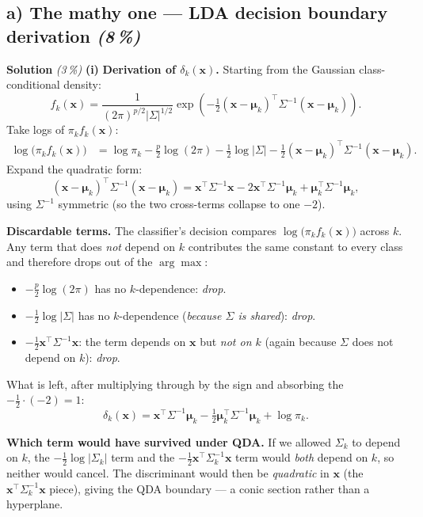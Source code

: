 \documentclass[11pt,a4paper]{article}
\newcommand{\subpoints}[1]{\textit{(#1\,\%)}}
\newcommand{\sol}{\noindent\textbf{Solution}}
\begin{document}
\subsection*{a) The mathy one --- LDA decision boundary derivation \subpoints{8}}

\sol{} \subpoints{3} \textbf{(i)} \textbf{Derivation of $\delta_k(\mathbf x)$.} Starting from the
Gaussian class-conditional density:
$$f_k(\mathbf x) = \frac{1}{(2\pi)^{p/2}|\Sigma|^{1/2}}
   \exp\!\left(-\tfrac{1}{2}(\mathbf x - \boldsymbol\mu_k)^\top\Sigma^{-1}(\mathbf x - \boldsymbol\mu_k)\right).$$
Take logs of $\pi_k f_k(\mathbf x)$:
\begin{align*}
\log\!\bigl(\pi_k f_k(\mathbf x)\bigr)
   &= \log\pi_k - \tfrac{p}{2}\log(2\pi) - \tfrac{1}{2}\log|\Sigma|
      - \tfrac{1}{2}(\mathbf x - \boldsymbol\mu_k)^\top\Sigma^{-1}(\mathbf x - \boldsymbol\mu_k).
\end{align*}
Expand the quadratic form:
$$(\mathbf x - \boldsymbol\mu_k)^\top\Sigma^{-1}(\mathbf x - \boldsymbol\mu_k)
   = \mathbf x^\top\Sigma^{-1}\mathbf x
     - 2\mathbf x^\top\Sigma^{-1}\boldsymbol\mu_k
     + \boldsymbol\mu_k^\top\Sigma^{-1}\boldsymbol\mu_k,$$
using $\Sigma^{-1}$ symmetric (so the two cross-terms collapse to one $-2$).

\medskip
\textbf{Discardable terms.} The classifier's decision compares
$\log\!\bigl(\pi_k f_k(\mathbf x)\bigr)$ across $k$. Any term that does \emph{not} depend on $k$
contributes the same constant to every class and therefore drops out of the $\arg\max$:
\begin{itemize}
  \item $-\tfrac{p}{2}\log(2\pi)$ has no $k$-dependence: \emph{drop}.
  \item $-\tfrac{1}{2}\log|\Sigma|$ has no $k$-dependence (\emph{because $\Sigma$ is shared}): \emph{drop}.
  \item $-\tfrac{1}{2}\mathbf x^\top\Sigma^{-1}\mathbf x$: the term depends on $\mathbf x$ but
        \emph{not on $k$} (again because $\Sigma$ does not depend on $k$): \emph{drop}.
\end{itemize}
What is left, after multiplying through by the sign and absorbing the $-\tfrac{1}{2}\cdot(-2) = 1$:
$$\boxed{\;\delta_k(\mathbf x)
   = \mathbf x^\top\Sigma^{-1}\boldsymbol\mu_k
     - \tfrac{1}{2}\boldsymbol\mu_k^\top\Sigma^{-1}\boldsymbol\mu_k
     + \log\pi_k.\;}$$

\medskip
\textbf{Which term would have survived under QDA.} If we allowed $\Sigma_k$ to depend on $k$, the
$-\tfrac{1}{2}\log|\Sigma_k|$ term and the $-\tfrac{1}{2}\mathbf x^\top\Sigma_k^{-1}\mathbf x$ term
would \emph{both} depend on $k$, so neither would cancel. The discriminant would then be
\emph{quadratic} in $\mathbf x$ (the $\mathbf x^\top\Sigma_k^{-1}\mathbf x$ piece), giving the
QDA boundary --- a conic section rather than a hyperplane.
\end{document}
